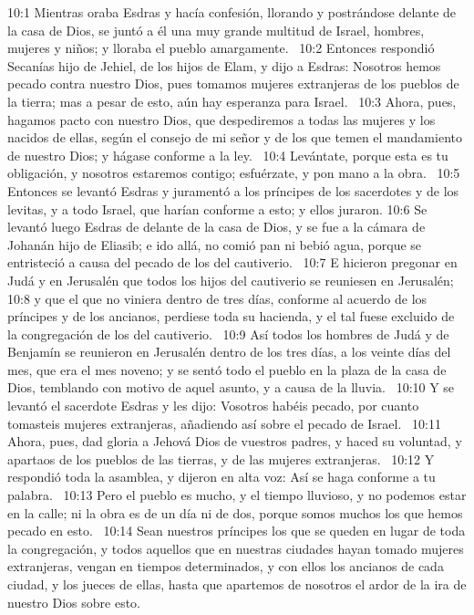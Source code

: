 10:1 Mientras oraba Esdras y hacía confesión, llorando y postrándose delante de la casa de Dios, se juntó a él una muy grande multitud de Israel, hombres, mujeres y niños; y lloraba el pueblo amargamente.  
10:2 Entonces respondió Secanías hijo de Jehiel, de los hijos de Elam, y dijo a Esdras: Nosotros hemos pecado contra nuestro Dios, pues tomamos mujeres extranjeras de los pueblos de la tierra; mas a pesar de esto, aún hay esperanza para Israel.  
10:3 Ahora, pues, hagamos pacto con nuestro Dios, que despediremos a todas las mujeres y los nacidos de ellas, según el consejo de mi señor y de los que temen el mandamiento de nuestro Dios; y hágase conforme a la ley.  
10:4 Levántate, porque esta es tu obligación, y nosotros estaremos contigo; esfuérzate, y pon mano a la obra.  
10:5 Entonces se levantó Esdras y juramentó a los príncipes de los sacerdotes y de los levitas, y a todo Israel, que harían conforme a esto; y ellos juraron. 
10:6 Se levantó luego Esdras de delante de la casa de Dios, y se fue a la cámara de Johanán hijo de Eliasib; e ido allá, no comió pan ni bebió agua, porque se entristeció a causa del pecado de los del cautiverio.  
10:7 E hicieron pregonar en Judá y en Jerusalén que todos los hijos del cautiverio se reuniesen en Jerusalén;  
10:8 y que el que no viniera dentro de tres días, conforme al acuerdo de los príncipes y de los ancianos, perdiese toda su hacienda, y el tal fuese excluido de la congregación de los del cautiverio.  
10:9 Así todos los hombres de Judá y de Benjamín se reunieron en Jerusalén dentro de los tres días, a los veinte días del mes, que era el mes noveno; y se sentó todo el pueblo en la plaza de la casa de Dios, temblando con motivo de aquel asunto, y a causa de la lluvia.  
10:10 Y se levantó el sacerdote Esdras y les dijo: Vosotros habéis pecado, por cuanto tomasteis mujeres extranjeras, añadiendo así sobre el pecado de Israel.  
10:11 Ahora, pues, dad gloria a Jehová Dios de vuestros padres, y haced su voluntad, y apartaos de los pueblos de las tierras, y de las mujeres extranjeras.  
10:12 Y respondió toda la asamblea, y dijeron en alta voz: Así se haga conforme a tu palabra.  
10:13 Pero el pueblo es mucho, y el tiempo lluvioso, y no podemos estar en la calle; ni la obra es de un día ni de dos, porque somos muchos los que hemos pecado en esto.  
10:14 Sean nuestros príncipes los que se queden en lugar de toda la congregación, y todos aquellos que en nuestras ciudades hayan tomado mujeres extranjeras, vengan en tiempos determinados, y con ellos los ancianos de cada ciudad, y los jueces de ellas, hasta que apartemos de nosotros el ardor de la ira de nuestro Dios sobre esto.  

